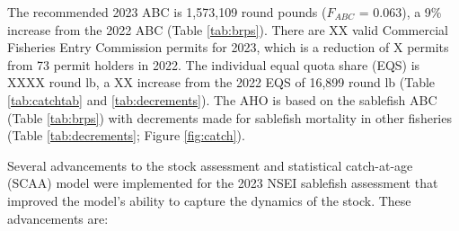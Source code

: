 \documentclass[
]{article}
\begin{document}
The recommended 2023 ABC is 1,573,109 round pounds (\(F_{ABC}\) = 0.063), a 9\% increase from the 2022 ABC (Table \ref{tab:brps}). There are {XX} valid Commercial Fisheries Entry Commission permits for 2023, which is a reduction of {X} permits from 73 permit holders in 2022. The individual equal quota share (EQS) is {XXXX} round lb, a {XX} increase from the 2022 EQS of 16,899 round lb (Table \ref{tab:catchtab} and \ref{tab:decrements}). The AHO is based on the sablefish ABC (Table \ref{tab:brps}) with decrements made for sablefish mortality in other fisheries (Table \ref{tab:decrements}; Figure \ref{fig:catch}).

Several advancements to the stock assessment and statistical catch-at-age (SCAA) model were implemented for the 2023 NSEI sablefish assessment that improved the model's ability to capture the dynamics of the stock. These advancements are:
\end{document}
